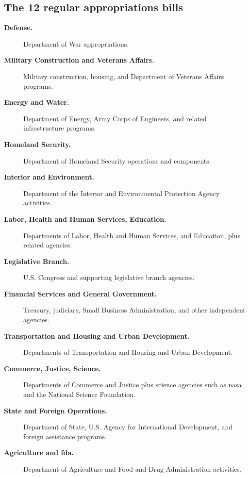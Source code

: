 \documentclass[../main.tex]{subfiles}
\begin{document}
\subsection{The 12 regular appropriations bills}
\begin{description}
  \item[\textbf{Defense.}] Department of War appropriations.
  \item[\textbf{Military Construction and Veterans Affairs.}] Military construction, housing, and Department of Veterans Affairs programs.
  \item[\textbf{Energy and Water.}] Department of Energy, Army Corps of Engineers, and related infrastructure programs.
  \item[\textbf{Homeland Security.}] Department of Homeland Security operations and components.
  \item[\textbf{Interior and Environment.}] Department of the Interior and Environmental Protection Agency activities.
  \item[\textbf{Labor, Health and Human Services, Education.}] Departments of Labor, Health and Human Services, and Education, plus related agencies.
  \item[\textbf{Legislative Branch.}] U.S. Congress and supporting legislative branch agencies.
  \item[\textbf{Financial Services and General Government.}] Treasury, judiciary, Small Business Administration, and other independent agencies.
  \item[\textbf{Transportation and Housing and Urban Development.}] Departments of Transportation and Housing and Urban Development.
  \item[\textbf{Commerce, Justice, Science.}] Departments of Commerce and Justice plus science agencies such as \ac{nasa} and the National Science Foundation.
  \item[\textbf{State and Foreign Operations.}] Department of State, U.S. Agency for International Development, and foreign assistance programs.
  \item[\textbf{Agriculture and \ac{fda}.}] Department of Agriculture and Food and Drug Administration activities.
\end{description}
\end{document}
